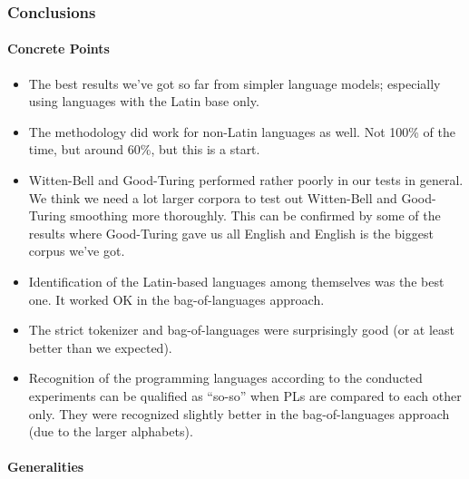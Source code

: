 
%


\subsubsection{Conclusions}

\paragraph{Concrete Points}

\begin{itemize}

\item
The best results we've got so far from simpler language models;
especially using languages with the Latin base only.

\item
The methodology did work for non-Latin languages as well. Not 100\% of the time,
but around 60\%, but this is a start.

\item
Witten-Bell and Good-Turing performed rather poorly in our tests in general.
We think we need a lot larger corpora to test out Witten-Bell and Good-Turing
smoothing more thoroughly. This can be confirmed by some of the results
where Good-Turing gave us all English and English is the biggest
corpus we've got.

\item
Identification of the Latin-based languages among themselves was the best one.
It worked OK in the bag-of-languages approach.

\item
The strict tokenizer and bag-of-languages were surprisingly good (or at least
better than we expected).

\item
Recognition of the programming languages according to the conducted
experiments can be qualified as ``so-so'' when PLs are compared to
each other only. They were recognized slightly better in the bag-of-languages
approach (due to the larger alphabets).

\end{itemize}

\paragraph{Generalities}

